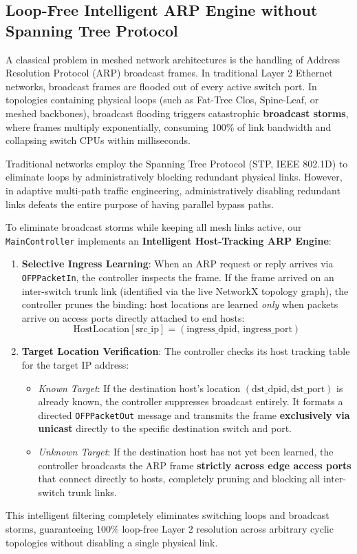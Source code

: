 \documentclass[12pt,a4paper,oneside]{report}
\begin{document}
\subsection{Loop-Free Intelligent ARP Engine without Spanning Tree Protocol}
A classical problem in meshed network architectures is the handling of Address Resolution Protocol (ARP) broadcast frames. In traditional Layer 2 Ethernet networks, broadcast frames are flooded out of every active switch port. In topologies containing physical loops (such as Fat-Tree Clos, Spine-Leaf, or meshed backbones), broadcast flooding triggers catastrophic \textbf{broadcast storms}, where frames multiply exponentially, consuming 100\% of link bandwidth and collapsing switch CPUs within milliseconds.

Traditional networks employ the Spanning Tree Protocol (STP, IEEE 802.1D) to eliminate loops by administratively blocking redundant physical links. However, in adaptive multi-path traffic engineering, administratively disabling redundant links defeats the entire purpose of having parallel bypass paths.

To eliminate broadcast storms while keeping all mesh links active, our \texttt{MainController} implements an \textbf{Intelligent Host-Tracking ARP Engine}:
\begin{enumerate}
    \item \textbf{Selective Ingress Learning}: When an ARP request or reply arrives via \texttt{OFPPacketIn}, the controller inspects the frame. If the frame arrived on an inter-switch trunk link (identified via the live NetworkX topology graph), the controller prunes the binding: host locations are learned \emph{only} when packets arrive on access ports directly attached to end hosts:
    \begin{equation}
        \text{HostLocation}[\text{src\_ip}] = (\text{ingress\_dpid}, \, \text{ingress\_port})
    \end{equation}
    \item \textbf{Target Location Verification}: The controller checks its host tracking table for the target IP address:
    \begin{itemize}
        \item \emph{Known Target}: If the destination host's location $(\text{dst\_dpid}, \text{dst\_port})$ is already known, the controller suppresses broadcast entirely. It formats a directed \texttt{OFPPacketOut} message and transmits the frame \textbf{exclusively via unicast} directly to the specific destination switch and port.
        \item \emph{Unknown Target}: If the destination host has not yet been learned, the controller broadcasts the ARP frame \textbf{strictly across edge access ports} that connect directly to hosts, completely pruning and blocking all inter-switch trunk links.
    \end{itemize}
\end{enumerate}
This intelligent filtering completely eliminates switching loops and broadcast storms, guaranteeing 100\% loop-free Layer 2 resolution across arbitrary cyclic topologies without disabling a single physical link.
\end{document}
